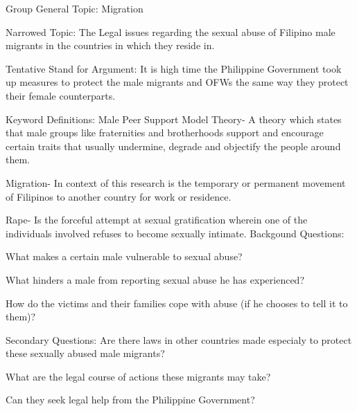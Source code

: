 
	\noindent Group General Topic: Migration

	\noindent  Narrowed Topic: The Legal issues regarding the sexual abuse of Filipino male migrants in the countries in which they reside in.

	\noindent Tentative Stand for Argument: It is high time the Philippine Government took up measures to protect the male migrants and OFWs the same way they protect their female counterparts.


	\begin{outline}
	 \1 Keyword Definitions:
	 \2 Male Peer Support Model Theory- A theory which states that male groups like fraternities and brotherhoods support and encourage certain traits that usually undermine, degrade and objectify the people around them.

	 \2 Migration- In context of this research is the temporary or permanent movement of Filipinos to another country for work or residence.
	
	 \2 Rape- Is the forceful attempt at sexual gratification wherein one of the individuals involved refuses to become sexually intimate.
	\1 Backgound Questions:

	\2 What makes a certain male vulnerable to sexual abuse?

	\2 What hinders a male from reporting sexual abuse he has experienced?

	\2 How do the victims and their families cope with abuse (if he chooses to tell it to them)?

	\1 Secondary Questions:	
	\2 Are there laws in other countries made especialy to protect these sexually abused male migrants?

	\2 What are the legal course of actions these migrants may take?

	\2 Can they seek legal help from the Philippine Government?
	

	\end{outline}
